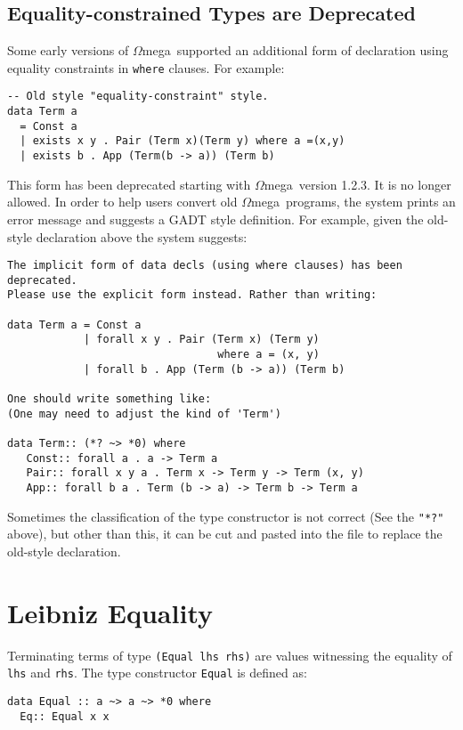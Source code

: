 \documentclass[11pt,twoside]{article}
\newcommand{\om}{$\Omega$mega}
\begin{document}
\subsection{Equality-constrained Types are Deprecated}
Some early versions of \om\ supported an additional form of declaration
using equality constraints in {\tt where} clauses. For example:
\begin{verbatim}
-- Old style "equality-constraint" style.
data Term a
  = Const a
  | exists x y . Pair (Term x)(Term y) where a =(x,y)
  | exists b . App (Term(b -> a)) (Term b)
\end{verbatim}
This form has been deprecated starting with \om\ version 1.2.3. It is no longer
allowed. In order to help users convert old \om\ programs, the system
prints an error message and suggests a GADT style definition. For example,
given the old-style declaration above the system suggests:
\begin{verbatim}
The implicit form of data decls (using where clauses) has been deprecated.
Please use the explicit form instead. Rather than writing:

data Term a = Const a
            | forall x y . Pair (Term x) (Term y)
                                 where a = (x, y)
            | forall b . App (Term (b -> a)) (Term b)

One should write something like:
(One may need to adjust the kind of 'Term')

data Term:: (*? ~> *0) where
   Const:: forall a . a -> Term a
   Pair:: forall x y a . Term x -> Term y -> Term (x, y)
   App:: forall b a . Term (b -> a) -> Term b -> Term a
\end{verbatim}
Sometimes the classification of the type constructor is not
correct (See the \verb+"*?"+ above), but other than this, it
can be cut and pasted into the file to replace the old-style declaration.


\section{Leibniz Equality} \label{equal}

Terminating terms of type \verb+(Equal lhs rhs)+ are values witnessing the equality
of {\tt lhs} and {\tt rhs}. The type constructor {\tt Equal} is defined as:

\begin{verbatim}
data Equal :: a ~> a ~> *0 where
  Eq:: Equal x x
\end{verbatim}
\end{document}
